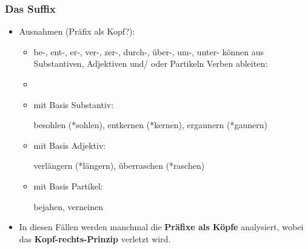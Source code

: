 \begin{frame}
\frametitle{Das Suffix}

\begin{itemize}
	\item Ausnahmen (Präfix als Kopf?):
	
	\begin{itemize}
		\item be-, ent-, er-, ver-, zer-, durch-, über-, um-, unter- können aus Substantiven, Adjektiven und/ oder Partikeln Verben ableiten:
		\item[]
		\item mit Basis Substantiv:
		
		\ea besohlen (*sohlen), entkernen (*kernen), ergaunern (*gaunern)
		\z
		
		\item mit Basis Adjektiv:
		
		\ea verlängern (*längern), überraschen (*raschen)
		\z
		
		\item mit Basis Partikel:
		
		\ea bejahen, verneinen
		\z
		
	\end{itemize}

	\item In diesen Fällen werden manchmal die \textbf{Präfixe als Köpfe} analysiert, wobei das \textbf{Kopf-rechts-Prinzip} verletzt wird.
	
\end{itemize}

\end{frame}




